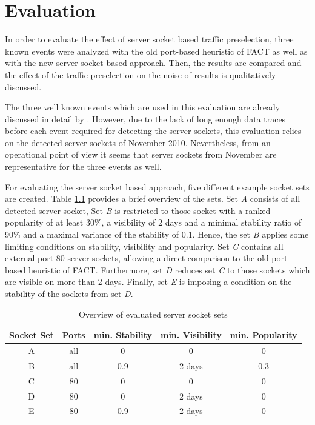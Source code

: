 

\chapter{Evaluation\label{chapter:results}}

In order to evaluate the effect of server socket based traffic preselection, 
three known events were analyzed with the old port-based heuristic of FACT as 
well as with the new server socket based approach. Then, the results are 
compared and the effect of the traffic preselection on the noise of results 
is qualitatively discussed.

The three well known events which are used in this evaluation are already 
discussed in detail by \citet{SchatzmannPAM2011}. However, due to the lack of 
long enough data traces before each event required for detecting the server 
sockets, this evaluation relies on the detected server sockets of November 2010.  
Nevertheless, from an operational point of view it seems that server sockets 
from November are representative for the three events as well. 

For evaluating the server socket based approach, five different example socket 
sets are created. Table \ref{tab:ses_sets} provides a brief overview of the 
sets. Set \emph{A} consists of all detected server socket, Set \emph{B} is 
restricted to those socket with a ranked popularity of at least 30\%, a 
visibility of 2 days and a minimal stability ratio of 90\% and a maximal 
variance of the stability of 0.1. Hence, the set \emph{B} applies some limiting 
conditions on stability, visibility and popularity. 
Set \emph{C} contains all external port 80 server sockets, allowing a direct comparison to the old port-based heuristic of FACT. Furthermore, set \emph{D} reduces set \emph{C} to those sockets which are visible on more than 2 days. Finally, set \emph{E} is imposing a condition on the stability of the sockets from set \emph{D}.

\begin{table}
	[ht] \centering 
	\begin{tabular}
		{|c|c|c|c|c|} \hline \textbf{Socket Set} & \textbf{Ports} & \textbf{min. Stability} & \textbf{min. Visibility} & \textbf{min. Popularity} \\
		\hline 
		\hline A & all & 0 & 0 & 0\\
		\hline B & all & 0.9 & 2 days & 0.3 \\
		\hline C & 80 & 0 & 0 & 0 \\
		\hline D & 80 & 0 & 2 days & 0 \\
		\hline E & 80 & 0.9 & 2 days & 0 \\
		\hline 
	\end{tabular}
	\caption{Overview of evaluated server socket sets}
	\label{tab:ses_sets}
\end{table}

